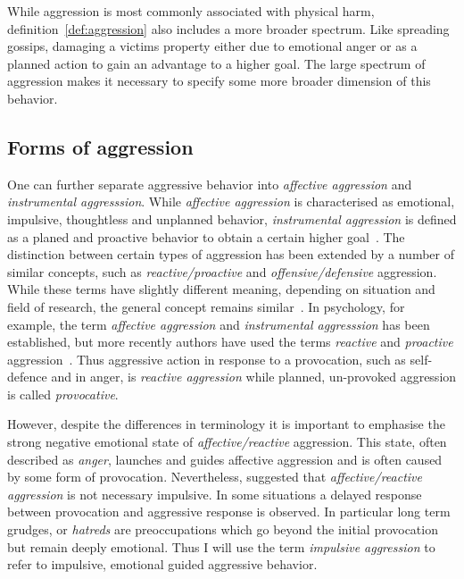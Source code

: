 While aggression is most commonly associated with physical harm, definition~\ref{def:aggression} also includes a more broader spectrum.
Like spreading gossips, damaging a victims property either due to emotional anger or as a planned action to gain an advantage to a higher goal.
The large spectrum of aggression makes it necessary to specify some more broader dimension of this behavior.

\subsection{Forms of aggression}
\label{sub:forms_of_aggression}

One can further separate aggressive behavior into \textit{affective aggression} and \textit{instrumental aggresssion}.
While \textit{affective aggression} is characterised as emotional, impulsive, thoughtless and unplanned behavior, \textit{instrumental aggression} is defined as a planed and proactive behavior to obtain a certain higher goal~\cite{Berkowitz1993,Geen2001}.
The distinction between certain types of aggression has been extended by a number of similar concepts, such as \textit{reactive/proactive} and \textit{offensive/defensive} aggression.
While these terms have slightly different meaning, depending on situation and field of research, the general concept remains similar~\cite{Geen2001, Blanchard2005b}.
In psychology, for example, the term \textit{affective aggression} and \textit{instrumental aggresssion} has been established, but more recently authors have used the terms \textit{reactive} and \textit{proactive} aggression~\cite{Geen2001}.
Thus aggressive action in response to a provocation, such as self-defence and in anger, is \textit{reactive aggression} while planned, un-provoked aggression is called \textit{provocative}.

However, despite the differences in terminology it is important to emphasise the strong negative emotional state of \textit{affective/reactive} aggression.
This state, often described as \textit{anger}, launches and guides affective aggression  and is often caused by some form of provocation\cite{Geen2001}.
Nevertheless, \citet{Frijda1994} suggested that \textit{affective/reactive aggression} is not necessary impulsive.
In some situations a delayed response between provocation and aggressive response is observed. 
In particular long term grudges, or \textit{hatreds} are preoccupations which go beyond the initial provocation but remain deeply emotional.
Thus I will use the term \textit{impulsive aggression} to refer to impulsive, emotional guided aggressive behavior.

